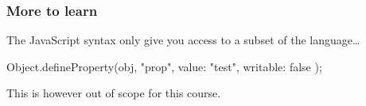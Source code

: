 \begin{frame}[fragile] \frametitle{More to learn}

The JavaScript syntax only give you access to a subset of the language\ldots
\vspace{8mm}
\begin{CodeBox}{}
Object.defineProperty(obj, "prop", {
    value: "test",
    writable: false
});
\end{CodeBox}
\vspace{8mm}
This is however out of scope for this course.
\end{frame}

